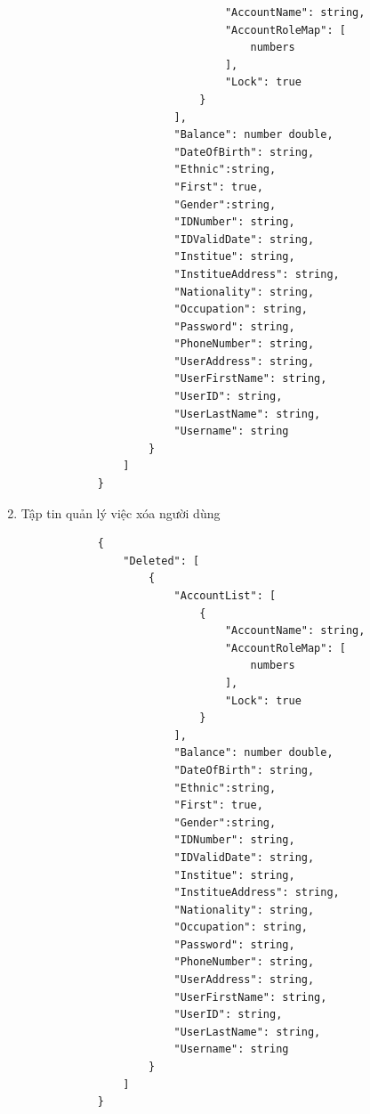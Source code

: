 \documentclass[12pt,a4paper]{report}
\begin{document}
\begin{enumerate}
\begin{verbatim}
                                "AccountName": string,
                                "AccountRoleMap": [
                                    numbers
                                ],
                                "Lock": true
                            }
                        ],
                        "Balance": number double,
                        "DateOfBirth": string,
                        "Ethnic":string,
                        "First": true,
                        "Gender":string,
                        "IDNumber": string,
                        "IDValidDate": string,
                        "Institue": string,
                        "InstitueAddress": string,
                        "Nationality": string,
                        "Occupation": string,
                        "Password": string,
                        "PhoneNumber": string,
                        "UserAddress": string,
                        "UserFirstName": string,
                        "UserID": string,
                        "UserLastName": string,
                        "Username": string
                    }
                ]
            }
            \end{verbatim}
            \newpage
            \item Tập tin quản lý việc xóa người dùng
%
            \begin{verbatim}
            {
                "Deleted": [
                    {
                        "AccountList": [
                            {
                                "AccountName": string,
                                "AccountRoleMap": [
                                    numbers
                                ],
                                "Lock": true
                            }
                        ],
                        "Balance": number double,
                        "DateOfBirth": string,
                        "Ethnic":string,
                        "First": true,
                        "Gender":string,
                        "IDNumber": string,
                        "IDValidDate": string,
                        "Institue": string,
                        "InstitueAddress": string,
                        "Nationality": string,
                        "Occupation": string,
                        "Password": string,
                        "PhoneNumber": string,
                        "UserAddress": string,
                        "UserFirstName": string,
                        "UserID": string,
                        "UserLastName": string,
                        "Username": string
                    }
                ]
            }
            \end{verbatim}
        \end{enumerate}
        \newpage
\end{document}
